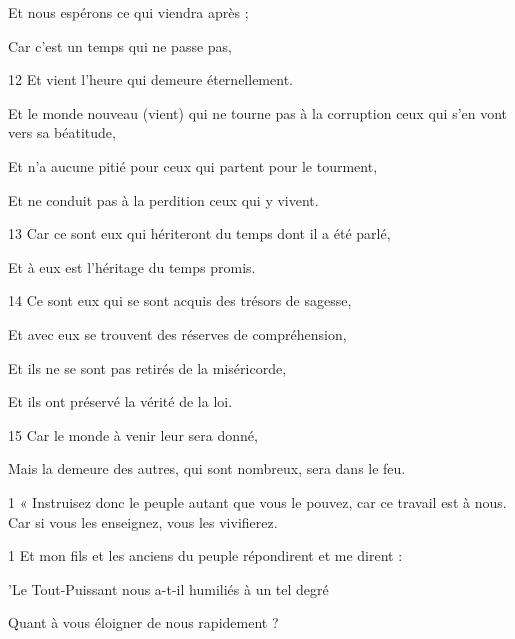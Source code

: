 \par Et nous espérons ce qui viendra après ;

\par Car c'est un temps qui ne passe pas,

\par 12 Et vient l'heure qui demeure éternellement.

\par Et le monde nouveau (vient) qui ne tourne pas à la corruption ceux qui s'en vont vers sa béatitude,

\par Et n'a aucune pitié pour ceux qui partent pour le tourment,

\par Et ne conduit pas à la perdition ceux qui y vivent.

\par 13 Car ce sont eux qui hériteront du temps dont il a été parlé,

\par Et à eux est l'héritage du temps promis.

\par 14 Ce sont eux qui se sont acquis des trésors de sagesse,

\par Et avec eux se trouvent des réserves de compréhension,

\par Et ils ne se sont pas retirés de la miséricorde,

\par Et ils ont préservé la vérité de la loi.

\par 15 Car le monde à venir leur sera donné,

\par Mais la demeure des autres, qui sont nombreux, sera dans le feu.


\par 1 « Instruisez donc le peuple autant que vous le pouvez, car ce travail est à nous. Car si vous les enseignez, vous les vivifierez.


\par 1 Et mon fils et les anciens du peuple répondirent et me dirent :

\par 'Le Tout-Puissant nous a-t-il humiliés à un tel degré

\par Quant à vous éloigner de nous rapidement ?


